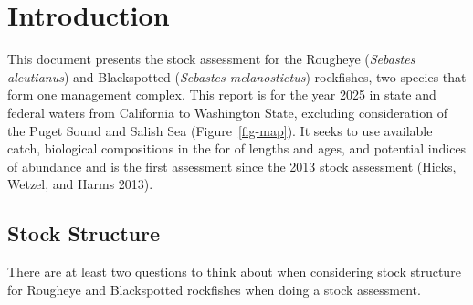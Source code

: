 \documentclass[
]{scrartcl}
\begin{document}
\newpage{}

\section{Introduction}\label{introduction}

This document presents the stock assessment for the Rougheye
(\emph{Sebastes aleutianus}) and Blackspotted (\emph{Sebastes
melanostictus}) rockfishes, two species that form one management
complex. This report is for the year 2025 in state and federal waters
from California to Washington State, excluding consideration of the
Puget Sound and Salish Sea (Figure~\ref{fig-map}). It seeks to use
available catch, biological compositions in the for of lengths and ages,
and potential indices of abundance and is the first assessment since the
2013 stock assessment (Hicks, Wetzel, and Harms 2013).

\subsection{Stock Structure}\label{stock-structure}

There are at least two questions to think about when considering stock
structure for Rougheye and Blackspotted rockfishes when doing a stock
assessment.
\end{document}
